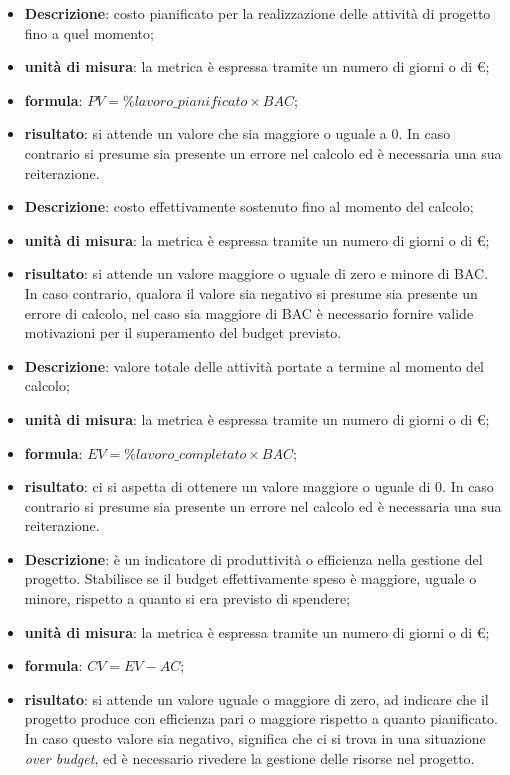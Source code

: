 		\begin{itemize}
			\item \textbf{Descrizione}: costo pianificato per la realizzazione delle attività di progetto fino a quel momento;
			\item \textbf{unità di misura}: la metrica è espressa tramite un numero di giorni o di \euro;
			\item \textbf{formula}: $PV = \%lavoro\_pianificato \times BAC$;
			\item \textbf{risultato}: si attende un valore che sia maggiore o uguale a 0. In caso contrario si presume sia presente un errore nel calcolo ed è necessaria una sua reiterazione.
		\end{itemize}
		\begin{itemize}
			\item \textbf{Descrizione}: costo effettivamente sostenuto fino al momento del calcolo;
			\item \textbf{unità di misura}: la metrica è espressa tramite un numero di giorni o di \euro;
			\item \textbf{risultato}: si attende un valore maggiore o uguale di zero e minore di BAC. In caso contrario, qualora il valore sia negativo si presume sia presente un errore di calcolo, nel caso sia maggiore di BAC è necessario fornire valide motivazioni per il superamento del budget previsto.
		\end{itemize}
		\begin{itemize}
			\item \textbf{Descrizione}: valore totale delle attività portate a termine al momento del calcolo;
			\item \textbf{unità di misura}: la metrica è espressa tramite un numero di giorni o di \euro;
			\item \textbf{formula}: $EV = \%lavoro\_completato \times BAC$;
			\item \textbf{risultato}: ci si aspetta di ottenere un valore maggiore o uguale di 0. In caso contrario si presume sia presente un errore nel calcolo ed è necessaria una sua reiterazione.
		\end{itemize}
		\begin{itemize}
			\item \textbf{Descrizione}: è un indicatore di produttività o efficienza nella gestione del progetto. Stabilisce se il budget effettivamente speso è maggiore, uguale o minore, rispetto a quanto si era previsto di spendere;
			\item \textbf{unità di misura}: la metrica è espressa tramite un numero di giorni o di \euro;
			\item \textbf{formula}: $CV = EV - AC$;
			\item \textbf{risultato}: si attende un valore uguale o maggiore di zero, ad indicare che il progetto produce con efficienza pari o maggiore rispetto a quanto pianificato. In caso questo valore sia negativo, significa che ci si trova in una situazione \textit{over budget}, ed è necessario rivedere la gestione delle risorse nel progetto.
		\end{itemize}
